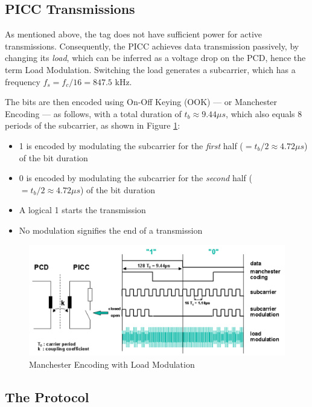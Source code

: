 \documentclass[fleqn,10pt]{SelfArx} %
\newcommand{\ms}{\ensuremath{\mu s} }
\begin{document}
\subsection{PICC Transmissions}
\label{subsec:picc}

As mentioned above, the tag does not have sufficient power for active transmissions. Consequently, the PICC achieves data transmission passively, by changing its {\em load}, which can be inferred as a voltage drop on the PCD, hence the term Load Modulation. Switching the load generates a subcarrier, which has a frequency $f_s=f_c/16=847.5$ kHz. 

The bits are then encoded using On-Off Keying (OOK) --- or Manchester Encoding --- as follows, with a total duration of $t_b\approx9.44\ms$, which also equals 8 periods of the subcarrier, as shown in Figure \ref{fig:manchester}:

\begin{itemize}[noitemsep] 
\item 1 is encoded by modulating the subcarrier for the {\em first} half ($=t_b/2\approx4.72\ms$) of the bit duration
\item 0  is encoded by modulating the subcarrier for the {\em second} half ($=t_b/2\approx4.72\ms$) of the bit duration
\item A logical 1 starts the transmission
\item No modulation signifies the end of a transmission
\end{itemize}


\begin{figure}[tp]
  \includegraphics[width=\linewidth]{img/manchester}
  \caption{Manchester Encoding with Load Modulation \cite{mifare}}
  \label{fig:manchester}
\end{figure}


\subsection{The Protocol}
\label{subsec:protocol}
\end{document}
